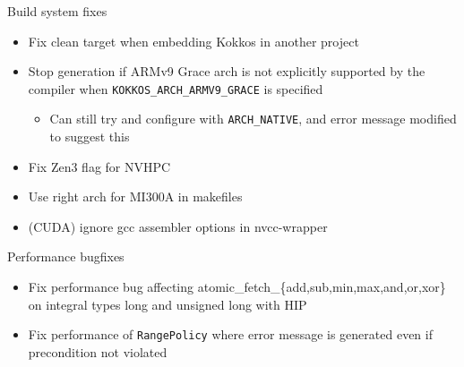 \begin{frame}[fragile]{Build system fixes}
  \begin{itemize}
      \item Fix clean target when embedding Kokkos in another project
      \item Stop generation if ARMv9 Grace arch is not explicitly supported by the compiler when \texttt{KOKKOS\_ARCH\_ARMV9\_GRACE} is specified
      \begin{itemize}
        \item Can still try and configure with \texttt{ARCH\_NATIVE}, and error message modified to suggest this
      \end{itemize}
      \item Fix Zen3 flag for NVHPC
      \item Use right arch for MI300A in makefiles
      \item (CUDA) ignore gcc assembler options in nvcc-wrapper
  \end{itemize}
 \end{frame}

\begin{frame}[fragile]{Performance bugfixes}
 \begin{itemize}
     \item Fix performance bug affecting atomic\_fetch\_\{add,sub,min,max,and,or,xor\} on integral types long and unsigned long with HIP
     \item Fix performance of \texttt{RangePolicy} where error message is generated even if precondition not violated
 \end{itemize}
\end{frame}




